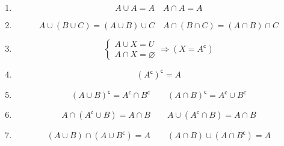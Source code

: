 \documentclass[a4paper, 12pt, oneside, titlepage, BCOR=1mm, DIV=12]{scrreprt}
\newcommand{\compl}{^\mathsf{c}}
\let\emptyset\varnothing
\let\emptyset\varnothing
\newcommand{\compl}{^\mathsf{c}}
\begin{document}
\begin{enumerate}
    \item \normalsize{}

      \begin{displaymath}
        A\cup{A} = A \quad A\cap{A} = A
      \end{displaymath}

    \item \normalsize{}

      \begin{displaymath}
        A\cup{(B\cup{C})}=(A\cup{B})\cup{C} \quad A\cap{(B\cap{C})} = (A\cap{B})\cap{C}
      \end{displaymath}

    \item \normalsize{}
      \begin{displaymath}
        \left\{\begin{array}{l}
            A \cup{X} = U \\
            A \cap{X} = \emptyset
            \end{array} \Rightarrow (X = A\compl)
      \end{displaymath}

    \item \normalsize{}
      \begin{displaymath}
        (A\compl)\compl = A
      \end{displaymath}

    \item \normalsize{}
      \begin{displaymath}
        (A\cup{B})\compl = A\compl\cap{B\compl} \qquad (A\cap{B})\compl = A\compl\cup{B\compl}
      \end{displaymath}

    \item \normalsize{}
      \begin{displaymath}
        A\cap{(A\compl\cup{B})}=A\cap{B} \qquad A\cup{(A\compl\cap{B})}=A\cap{B}
      \end{displaymath}

    \item \normalsize{}
      \begin{displaymath}
        (A\cup{B})\cap{(A\cup{B\compl})} = A \qquad    (A\cap{B})\cup{(A\cap{B\compl})} = A
      \end{displaymath}

  \end{enumerate}
\end{document}
